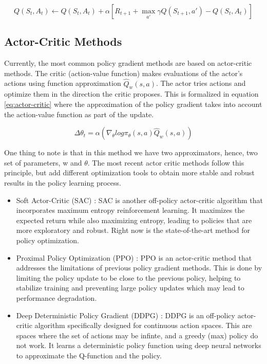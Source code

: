 \begin{equation} \label{eq:q_leaning}
	{Q}(S_t, A_t) \leftarrow {Q}(S_t, A_t) + \alpha[R_{t+1} +  \operatorname*{max}_{a'}\gamma{Q}(S_{t+1}, a') - {Q}(S_t, A_t)]
\end{equation}

\subsection{Actor-Critic Methods}
\label{sec:ac-methods}
Currently, the most common policy gradient methods are based on actor-critic methods. The critic (action-value function) makes evaluations of the actor's actions using function approximation $\hat{{Q}}_{w}(s,a)$. The actor tries actions and optimize them in the direction the critic proposes. This is formalized in equation \ref{eq:actor-critic} where the approximation of the policy gradient takes into account the action-value function as part of the update.

\begin{equation}\label{eq:actor-critic}
	\Delta\theta_{t} = \alpha(\nabla_{\theta} log \pi_{\theta}(s,a)\hat{{Q}}_{w}(s,a))
\end{equation}

One thing to note is that in this method we have two approximators, hence, two set of parameters, w and $\theta$. The most recent actor critic methods follow this principle, but add different optimization tools to obtain more stable and robust results in the policy learning process.

\begin{itemize}
	\item Soft Actor-Critic (SAC) \cite{haarnoja2018soft}: SAC is another off-policy actor-critic algorithm that incorporates maximum entropy reinforcement learning. It maximizes the expected return while also maximizing entropy, leading to policies that are more exploratory and robust. Right now is the state-of-the-art method for policy optimization.
	\item Proximal Policy Optimization (PPO) \cite{schulman2017proximal}: PPO is an actor-critic method that addresses the limitations of previous policy gradient methods. This is done by limiting the policy update to be close to the previous policy, helping to stabilize training and preventing large policy updates which may lead to performance degradation.
	\item Deep Deterministic Policy Gradient (DDPG) \cite{lillicrap2019continuous}: DDPG is an off-policy actor-critic algorithm specifically designed for continuous action spaces. This are spaces where the set of actions may be infinte, and a greedy (max) policy do not work. It learns a deterministic policy function using deep neural networks to approximate the Q-function and the policy.
\end{itemize}

